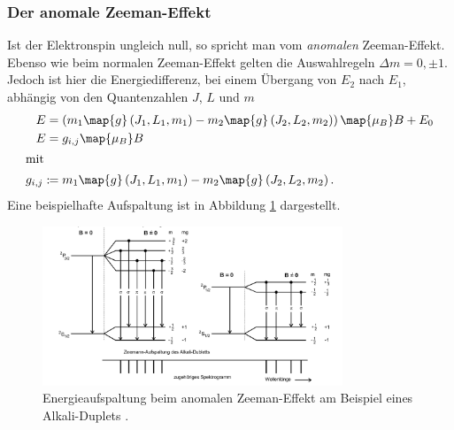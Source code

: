 \subsubsection{Der anomale Zeeman-Effekt}
Ist der Elektronspin ungleich null, so spricht man vom \emph{anomalen} Zeeman-Effekt.
Ebenso wie beim normalen Zeeman-Effekt gelten die Auswahlregeln $\Delta m=0, \pm 1$.
Jedoch ist hier die Energiedifferenz, bei einem Übergang von $E_2$ nach $E_1$,
abhängig von den Quantenzahlen $J$, $L$ und $m$
\begin{align}
  E&=\left(m_1\map{g}\left(J_1,L_1,m_1\right)-m_2\map{g}\left(J_2,L_2,m_2\right)\right)\map{\mu_B}B+E_0 \notag \\
  E&=g_{i,j}\map{\mu_B}B \label{eq:energie_anomale_zemman}\\
\shortintertext{mit}
g_{i,j}:\!\!&=m_1\map{g}\left(J_1,L_1,m_1\right)-m_2\map{g}\left(J_2,L_2,m_2\right)\label{eq: faktor_gij}.
\end{align}
Eine beispielhafte Aufspaltung ist in Abbildung \ref{fig: energie_aufspaltung_annomaler} dargestellt.
\FloatBarrier
\begin{figure}[h]
  \centering
  \includegraphics[width=0.8\textwidth]{pics/energieaufspaltung_annomaler.png}
  \caption{Energieaufspaltung beim anomalen Zeeman-Effekt am Beispiel eines Alkali-Duplets \cite{anleitung27}.}
  \label{fig: energie_aufspaltung_annomaler}
\end{figure}
\FloatBarrier
